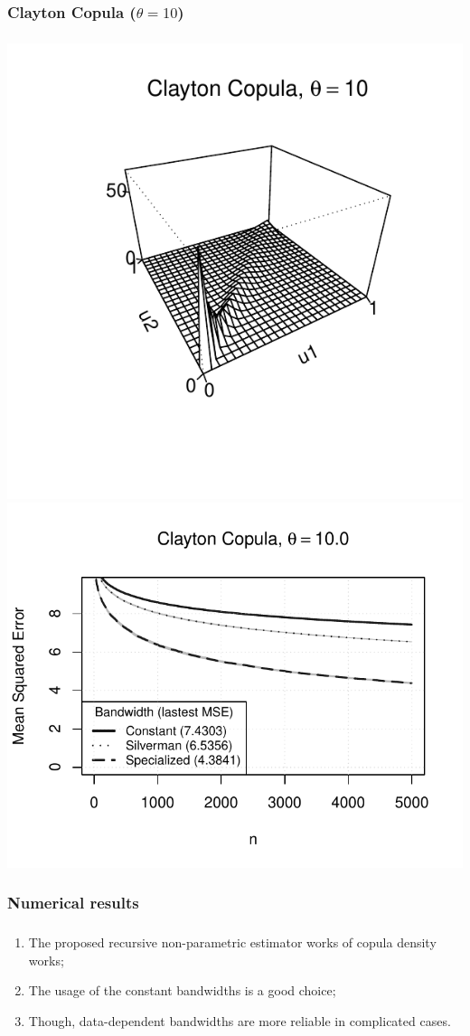 \documentclass[aspectratio=169]{beamer}
\begin{document}
		\subsubsection{Clayton Copula ($ \theta = 10 $)}
			\begin{frame}
				\frametitle{\insertsubsubsection}
				
				\begin{flushleft}
					\includegraphics[width=0.4\linewidth]{plots/numerical_results/clayton10}
					\includegraphics[width=0.5\linewidth]{../text/plots/experiment_results/clayton10}
				\end{flushleft}
				
			\end{frame}
	
		\subsubsection{Numerical results}
			\begin{frame}
				\frametitle{\insertsubsubsection}
				
				\begin{enumerate}
					\item The proposed recursive non-parametric estimator works of copula density works;
					\item<2-> The usage of the constant bandwidths is a good choice;
					\item<3-> Though, data-dependent bandwidths are more reliable in complicated cases.
				\end{enumerate}
				
			\end{frame}
	
\end{document}
